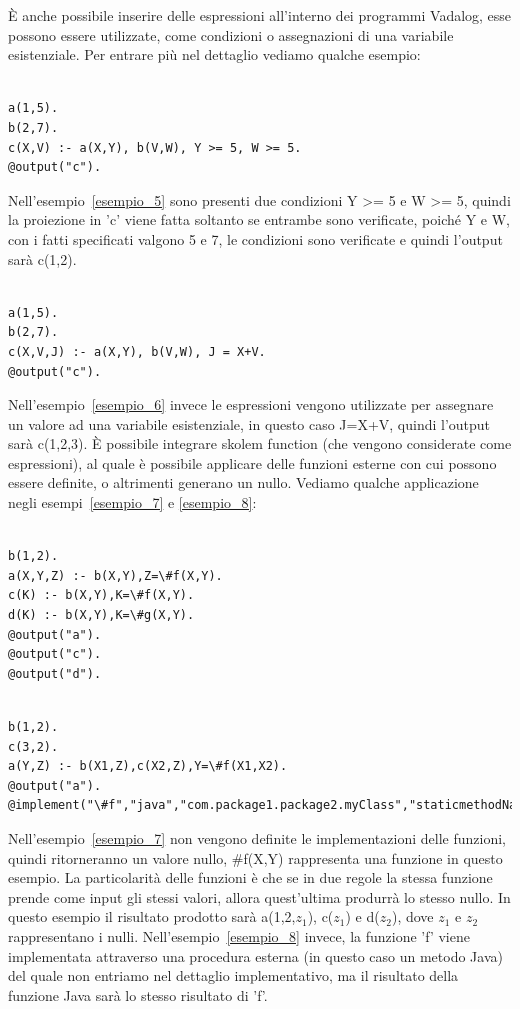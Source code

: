 È anche possibile inserire delle espressioni all'interno dei programmi Vadalog, esse possono essere utilizzate, come condizioni o assegnazioni di una variabile esistenziale. Per entrare più nel dettaglio vediamo qualche esempio: 
\begin{example}\label{esempio_5}
\begin{lstlisting}

a(1,5). 
b(2,7). 
c(X,V) :- a(X,Y), b(V,W), Y >= 5, W >= 5. 
@output("c"). 
\end{lstlisting}
\end{example} 
Nell'esempio~\ref{esempio_5} sono presenti due condizioni Y >= 5 e W >= 5, quindi la proiezione in 'c' viene fatta soltanto se entrambe sono verificate, poiché Y e W, con i fatti specificati valgono 5 e 7, le condizioni sono verificate e quindi l'output sarà c(1,2). \newline
\begin{example}\label{esempio_6}
\begin{lstlisting}

a(1,5). 
b(2,7). 
c(X,V,J) :- a(X,Y), b(V,W), J = X+V. 
@output("c").
\end{lstlisting}
\end{example}
Nell'esempio~\ref{esempio_6} invece le espressioni vengono utilizzate per assegnare un valore ad una variabile esistenziale, in questo caso J=X+V, quindi l'output sarà c(1,2,3). \newline
È possibile integrare skolem function (che vengono considerate come espressioni), al quale è possibile applicare delle funzioni esterne con cui possono essere definite, o altrimenti generano un nullo. Vediamo qualche applicazione negli esempi~\ref{esempio_7} e \ref{esempio_8}:
\begin{example}\label{esempio_7}
\begin{lstlisting}

b(1,2). 
a(X,Y,Z) :- b(X,Y),Z=\#f(X,Y). 
c(K) :- b(X,Y),K=\#f(X,Y). 
d(K) :- b(X,Y),K=\#g(X,Y). 
@output("a"). 
@output("c"). 
@output("d"). 
\end{lstlisting}
\end{example}
\begin{example}\label{esempio_8}
\begin{lstlisting}

b(1,2). 
c(3,2). 
a(Y,Z) :- b(X1,Z),c(X2,Z),Y=\#f(X1,X2). 
@output("a"). 
@implement("\#f","java","com.package1.package2.myClass","staticmethodName").
\end{lstlisting}
\end{example}
Nell'esempio~\ref{esempio_7} non vengono definite le implementazioni delle funzioni, quindi ritorneranno un valore nullo, \#f(X,Y) rappresenta una funzione in questo esempio. La particolarità delle funzioni è che se in due regole la stessa funzione prende come input gli stessi valori, allora quest'ultima produrrà lo stesso nullo. In questo esempio il risultato prodotto sarà a(1,2,$z_{1}$), c($z_{1}$) e d($z_{2}$), dove $z_{1}$ e $z_{2}$ rappresentano i nulli. 
Nell'esempio~\ref{esempio_8} invece, la funzione 'f' viene implementata attraverso una procedura esterna (in questo caso un metodo Java) del quale non entriamo nel dettaglio implementativo, ma il risultato della funzione Java sarà lo stesso risultato di 'f'.